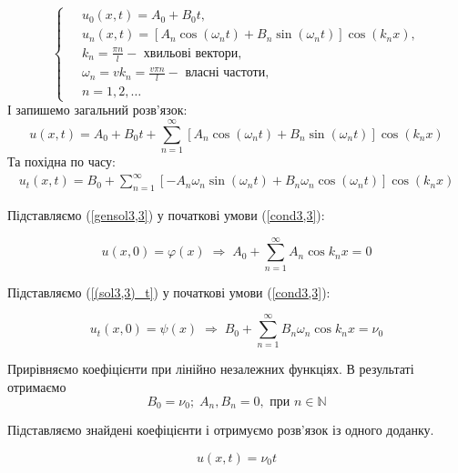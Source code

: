 \begin{equation}
    \left\{ \begin{aligned} \label{mode3,3}
        \;&u_0(x,t) = A_0 + B_0 t, \\
        &u_n(x,t) = \left[A_n\cos(\omega_n t) + B_n\sin(\omega_n t)\right] \cos(k_n x), \\
        &k_n = \frac{\pi n}{l} - \text{ хвильові вектори}, \\
        &\omega_n = vk_n = \frac{v \pi n}{l} - \text{ власні частоти}, \\
        &n = 1, 2,\ldots
    \end{aligned}\right.
\end{equation}
І запишемо загальний розв'язок:
\begin{equation} \label{gensol3,3}
    u(x,t) = A_0 + B_0 t + \sum^{\infty}_{n=1} \left[A_n\cos(\omega_n t) + B_n\sin(\omega_n t)\right] \cos(k_n x)
\end{equation}
Та похідна по часу:
\begin{equation} \label{(sol3,3)_t}
    \begin{aligned}
        u_t(x,t) = B_0 + \sum^{\infty}_{n=1}\left[-A_n\omega_n\sin(\omega_n t) + B_n\omega_n\cos(\omega_n t)\right] \cos(k_n x)  
    \end{aligned}
\end{equation}

Підставляємо (\ref{gensol3,3}) у початкові умови (\ref{cond3,3}):

\begin{equation}
    u(x,0) = \varphi(x) \;\Rightarrow\; A_0 + \sum^{\infty}_{n=1} A_n\cos k_nx = 0
\end{equation}

Підставляємо (\ref{(sol3,3)_t}) у початкові умови (\ref{cond3,3}):

\begin{equation}
    u_t(x,0) = \psi(x) \;\Rightarrow\; B_0 + \sum^{\infty}_{n=1} B_n \omega_n \cos k_nx = \nu_0     
\end{equation}

Прирівняємо коефіцієнти при лінійно незалежних функціях. В результаті отримаємо  \[B_0 = \nu_0;\; A_n, B_n = 0, \text{ при } n \in \mathbb{N}\]

Підставляємо знайдені коефіцієнти і отримуємо розв'язок із одного доданку.

\begin{equation}
    u (x,t) = \nu_0 t 
\end{equation}

